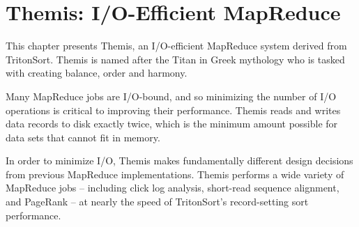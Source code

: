 \chapter{Themis: I/O-Efficient MapReduce}
\label{chapter:themis}

This chapter presents Themis, an I/O-efficient MapReduce system derived from
TritonSort. Themis is named after the Titan in Greek mythology who is tasked
with creating balance, order and harmony.

Many MapReduce jobs are I/O-bound, and so minimizing the number of I/O
operations is critical to improving their performance. Themis reads and writes
data records to disk exactly twice, which is the minimum amount possible for
data sets that cannot fit in memory.

In order to minimize I/O, Themis makes fundamentally different design decisions
from previous MapReduce implementations. Themis performs a wide variety of
MapReduce jobs -- including click log analysis, short-read sequence alignment,
and PageRank -- at nearly the speed of TritonSort's record-setting sort
performance.









